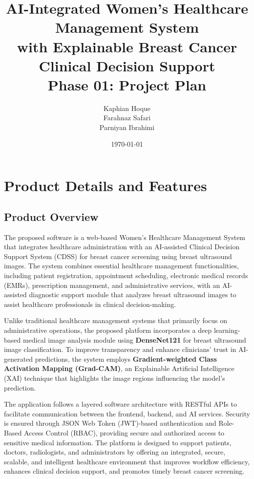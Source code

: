 \documentclass[12pt,a4paper]{report}
\title{\textbf{AI-Integrated Women's Healthcare Management System \\ with Explainable Breast Cancer Clinical Decision Support}\\[0.5em]
\large Phase 01: Project Plan}
\author{Kaphian Hoque \\ Farahnaz Safari \\ Parniyan Ibrahimi }
\date{\today}
\begin{document}
\maketitle
\tableofcontents
\newpage

\chapter{Product Details and Features}

\section{Product Overview}

The proposed software is a web-based Women's Healthcare Management System that integrates healthcare administration with an AI-assisted Clinical Decision Support System (CDSS) for breast cancer screening using breast ultrasound images. The system combines essential healthcare management functionalities, including patient registration, appointment scheduling, electronic medical records (EMRs), prescription management, and administrative services, with an AI-assisted diagnostic support module that analyzes breast ultrasound images to assist healthcare professionals in clinical decision-making.

Unlike traditional healthcare management systems that primarily focus on administrative operations, the proposed platform incorporates a deep learning-based medical image analysis module using \textbf{DenseNet121} for breast ultrasound image classification. To improve transparency and enhance clinicians' trust in AI-generated predictions, the system employs \textbf{Gradient-weighted Class Activation Mapping (Grad-CAM)}, an Explainable Artificial Intelligence (XAI) technique that highlights the image regions influencing the model's prediction.

The application follows a layered software architecture with RESTful APIs to facilitate communication between the frontend, backend, and AI services. Security is ensured through JSON Web Token (JWT)-based authentication and Role-Based Access Control (RBAC), providing secure and authorized access to sensitive medical information. The platform is designed to support patients, doctors, radiologists, and administrators by offering an integrated, secure, scalable, and intelligent healthcare environment that improves workflow efficiency, enhances clinical decision support, and promotes timely breast cancer screening.
\end{document}
